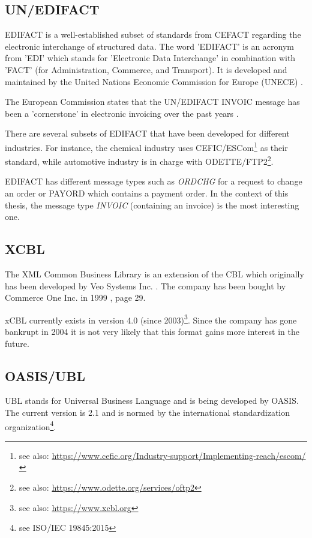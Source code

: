\subsection{UN/EDIFACT}
\label{sec2.1.1}

EDIFACT is a well-established \cite{basware} subset of standards from CEFACT regarding the electronic interchange of structured data. The word 'EDIFACT' is an acronym from 'EDI' which stands for 'Electronic Data Interchange' in combination with 'FACT' (for Administration, Commerce, and Transport). It is developed and maintained by the United Nations Economic Commission for Europe (UNECE) \cite{unece}.

The European Commission states that the UN/EDIFACT INVOIC message has been a 'cornerstone' in electronic invoicing over the past years \cite[page 14]{ec12}.

There are several subsets of EDIFACT that have been developed for different industries. For instance, the chemical industry uses CEFIC/ESCom\footnote{see also: \url{https://www.cefic.org/Industry-support/Implementing-reach/escom/}} as their standard, while automotive industry is in charge with ODETTE/FTP2\footnote{see also: \url{https://www.odette.org/services/oftp2}}.

EDIFACT has different message types such as \emph{ORDCHG} for a request to change an order or PAYORD which contains a payment order. In the context of this thesis, the message type \emph{INVOIC} (containing an invoice) is the most interesting one.

\subsection{XCBL}
\label{sec2.1.2}

The XML Common Business Library is an extension of the CBL which originally has been developed by Veo Systems Inc. \cite{coverpages}. The company has been bought by Commerce One Inc. in 1999 \cite{co}, page 29. 

xCBL currently exists in version 4.0 (since 2003)\footnote{see also: \url{https://www.xcbl.org}}. Since the company has gone bankrupt in 2004 \cite{scm} it is not very likely that this format gains more interest in the future.

\subsection{OASIS/UBL}
\label{sec2.1.3}

UBL stands for Universal Business Language and is being developed by OASIS. The current version is 2.1 and is normed by the international standardization organization\footnote{see ISO/IEC 19845:2015}.

